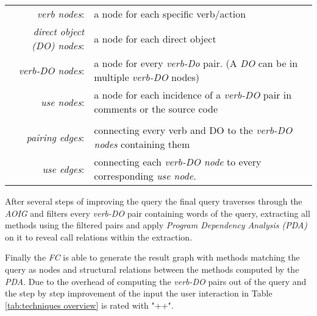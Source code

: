 \begin{table}[th]
	\begin{tabular}{r l}
		\textit{verb nodes}: & a node for each specific verb/action \\
		\textit{direct object (DO) nodes}: & a node for each direct object \\
		\textit{verb-DO nodes}: & a node for every \textit{verb-Do} pair. (A \textit{DO} can be in multiple \textit{verb-DO} nodes) \\
		\textit{use nodes}: & a node for each incidence of a \textit{verb-DO} pair in comments or the source code \\
		 & \\
		\textit{pairing edges}: & connecting every verb and DO to the \textit{verb-DO nodes} containing them \\
		\textit{use edges}: & connecting each \textit{verb-DO node} to every corresponding \textit{use node}.
	\end{tabular}
\end{table}

After several steps of improving the query the final query traverses through the \textit{AOIG} and filters every \textit{verb-DO} pair containing words of the query, extracting all methods using the filtered pairs and apply \textit{Program Dependency Analysis (PDA)} on it to reveal call relations within the extraction.

Finally the \emph{FC} is able to generate the result graph with methods matching the query as nodes and structural relations between the methods computed by the \textit{PDA}. \cite{shepherd2007using} \newline
Due to the overhead of computing the \textit{verb-DO} pairs out of the query and the step by step improvement of the input the user interaction in Table \ref{tab:techniques overview} is rated with "++".




